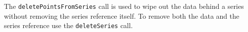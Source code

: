 The \verb+deletePointsFromSeries+ call is used to wipe out the data behind a series
without removing the series reference itself. To remove both the data and the series
reference use the \verb+deleteSeries+ call.
